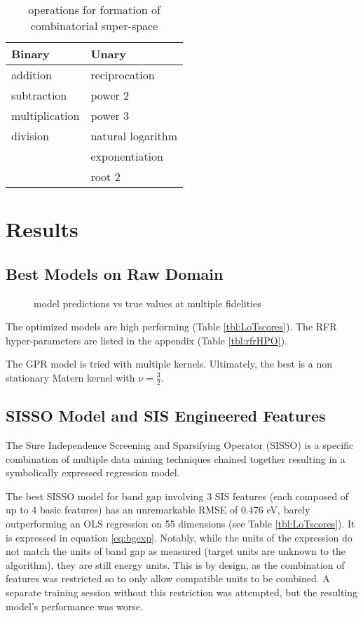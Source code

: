 \begin{table}[htbp]
\caption{\label{tbl:ops} operations for formation of combinatorial super-space}
\centering
\begin{tabular}{ll}
Binary & Unary\\[0pt]
\hline
addition & reciprocation\\[0pt]
subtraction & power 2\\[0pt]
multiplication & power 3\\[0pt]
division & natural logarithm\\[0pt]
 & exponentiation\\[0pt]
 & root 2\\[0pt]
\end{tabular}
\end{table}

\section{Results}
\label{sec:org92966da}
\subsection{Best Models on Raw Domain}
\label{sec:org8e8ef68}
 
\begin{figure}[htbp]
\centering

\caption{\label{fig:pairplots} model predictions vs true values at multiple fidelities}
\end{figure}

The optimized models are high performing (Table \ref{tbl:LoTscores}).
The RFR hyper-parameters are listed in the appendix (Table \ref{tbl:rfrHPO}).

The GPR model is tried with multiple kernels.
Ultimately, the best is a non stationary Matern kernel with \(\nu = \frac{3}{2}\).

\subsection{SISSO Model and SIS Engineered Features}
\label{sec:orge6aea5e}
The Sure Independence Screening and Sparsifying Operator (SISSO) is a specific combination of multiple data mining techniques chained together resulting in a symbolically expressed regression model.
\autocite{ouyang-2018-sisso,ghiringhelli-2017-learn-physic} 

The best SISSO model for band gap involving 3 SIS features (each composed of up to 4 basic features) has an unremarkable RMSE of 0.476 eV, barely outperforming an OLS regression on 55 dimensions (see Table \ref{tbl:LoTscores}).
It is expressed in equation \ref{eq:bgexp}.
Notably, while the units of the expression do not match the units of band gap as measured (target units are unknown to the algorithm), they are still energy units.
This is by design, as the combination of features was restricted so to only allow compatible units to be combined.
A separate training session without this restriction was attempted, but the resulting model's performance was worse.

